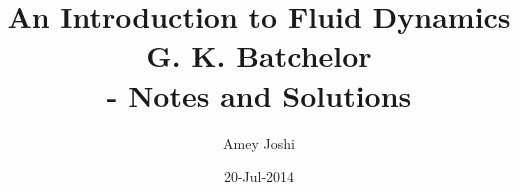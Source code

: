 \documentclass[a4paper]{report}
\begin{document}
\title{An Introduction to Fluid Dynamics\\G. K. Batchelor\\ - Notes and Solutions}
\author{Amey Joshi}
\date{20-Jul-2014}

\maketitle
\thispagestyle{empty}

\tableofcontents
\thispagestyle{empty}

%


\theoremstyle{plain}
\newtheorem{thm}{Theorem}[chapter]

\theoremstyle{plain}
\newtheorem{prop}{Proposition}[chapter]

\theoremstyle{plain}
\newtheorem{corr}{Corollary}[chapter]

\theoremstyle{definition}
\newtheorem{defn}{Definition}[chapter]

\theoremstyle{remark}
\newtheorem*{rem}{Remark}









\end{document}
